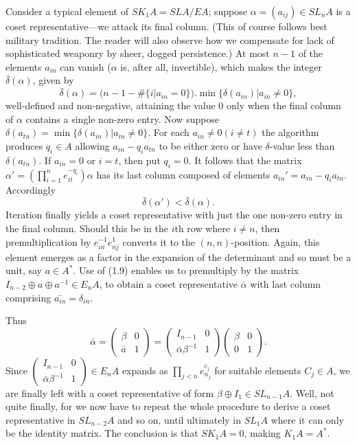 Consider a typical element of $SK_1A=SLA/EA$; suppose $\alpha=(a_{ij})\in SL_nA$ is a coset representative---we attack its final column. (This of course follows best military tradition. The reader will also observe how we compensate for lack of sophisticated weaponry by sheer, dogged persistence.) At most $n-1$ of the elements $a_{in}$ can vanish ($\alpha$ is, after all, invertible), which makes the integer $\bar{\delta}(\alpha)$, given by
\[\bar{\delta}(\alpha)=(n-1-\#\{i|a_{in}=0\}).\min\{\delta(a_{in})|a_{in}\neq 0\},\]
well-defined and non-negative, attaining the value $0$ only when the final column of $\alpha$ contains a single non-zero entry. Now suppose $\delta(a_{tn})=\min \{\delta(a_{in})|a_{in}\neq 0\}$. For each $a_{in}\neq 0 (i\neq t)$ the algorithm produces $q_i\in A$ allowing $a_{in}-q_ia_{tn}$ to be either zero or have $\delta$-value less than $\delta(a_{tn})$. If $a_{in}=0$ or $i=t$, then put $q_i=0$. It follows that the matrix $\alpha'=(\prod_{i=1}^n e_{it}^{-q_i})\alpha$ has its last column composed of elements $a_{in}'=a_{in}-q_ia_{tn}$. Accordingly
\[\bar{\delta}(\alpha')< \bar{\delta}(\alpha).\]
Iteration finally yields a coset representative with just the one non-zero entry in the final column. Should this be in the $i$th row where $i\neq n$, then premultiplication by $e_{in}^{-1}e_{nj}^1$ converts it to the $(n,n)$-position. Again, this element emerges as a factor in the expansion of the determinant and so must be a unit, say $a\in A^*$. Use of (1.9) enables us to premultiply by the matrix $I_{n-2}\oplus a\oplus a^{-1}\in E_nA$, to obtain a coset representative $\bar{\alpha}$ with last column comprising $\bar{a_{in}}=\delta_{in}$.

Thus
\[\bar{\alpha}=\begin{pmatrix} \beta & 0 \\ \bar{a} &  1 \end{pmatrix}=\begin{pmatrix} I_{n-1} & 0 \\ \bar{\alpha}\beta^{-1} &  1 \end{pmatrix}\begin{pmatrix} \beta & 0 \\ 0 &  1 \end{pmatrix}.\]
Since $\begin{pmatrix} I_{n-1} & 0 \\ \bar{\alpha}\beta^{-1} &  1 \end{pmatrix}\in E_n A$ expands as $\prod_{j<n}e_{n_j}^{c_j}$ for suitable elements $C_j\in A$, we are finally left with a coset representative of form $\beta \oplus I_1 \in SL_{n-1}A$. Well, not quite finally, for we now have to repeat the whole procedure to derive a coset representative in $SL_{n-2} A$ and so on, until ultimately in $SL_1A$ where it can only be the identity matrix. The conclusion is that $SK_1A=0$, making $K_1A=A^*$.

